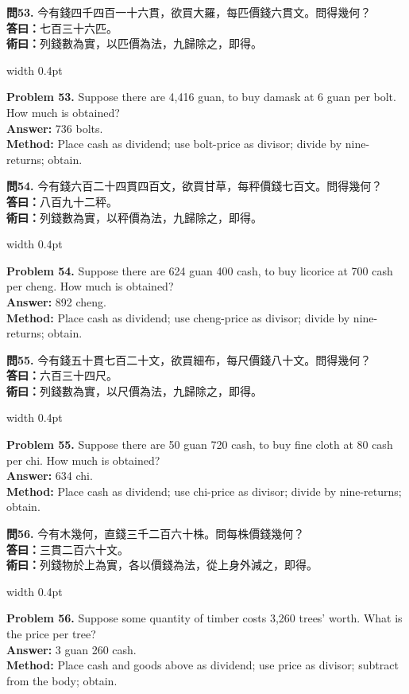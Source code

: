 \documentclass[10pt,a4paper]{article}
\newlength{\cnwidth}
\newlength{\enwidth}
\newcommand{\bilingual}[2]{%
  \noindent%
  \begin{minipage}[t]{\cnwidth}%
    #1%
  \end{minipage}%
  \hfill\vrule width 0.4pt\hfill%
  \begin{minipage}[t]{\enwidth}%
    #2%
  \end{minipage}%
  \par\smallskip%
}
\begin{document}
\bilingual{%
  \textbf{問53.}
  今有錢四千四百一十六貫，欲買大羅，每匹價錢六貫文。問得幾何？\\
  \textbf{答曰：}七百三十六匹。\\
  \textbf{術曰：}列錢數為實，以匹價為法，九歸除之，即得。
}{%
  \textbf{Problem 53.}
  Suppose there are 4,416 guan, to buy damask at 6 guan per bolt.
  How much is obtained?\\
  \textbf{Answer:} 736 bolts.\\
  \textbf{Method:} Place cash as dividend; use bolt-price as divisor; divide by
  nine-returns; obtain.
}

\bilingual{%
  \textbf{問54.}
  今有錢六百二十四貫四百文，欲買甘草，每秤價錢七百文。問得幾何？\\
  \textbf{答曰：}八百九十二秤。\\
  \textbf{術曰：}列錢數為實，以秤價為法，九歸除之，即得。
}{%
  \textbf{Problem 54.}
  Suppose there are 624 guan 400 cash, to buy licorice at 700 cash per cheng.
  How much is obtained?\\
  \textbf{Answer:} 892 cheng.\\
  \textbf{Method:} Place cash as dividend; use cheng-price as divisor; divide by
  nine-returns; obtain.
}

\bilingual{%
  \textbf{問55.}
  今有錢五十貫七百二十文，欲買細布，每尺價錢八十文。問得幾何？\\
  \textbf{答曰：}六百三十四尺。\\
  \textbf{術曰：}列錢數為實，以尺價為法，九歸除之，即得。
}{%
  \textbf{Problem 55.}
  Suppose there are 50 guan 720 cash, to buy fine cloth at 80 cash per chi.
  How much is obtained?\\
  \textbf{Answer:} 634 chi.\\
  \textbf{Method:} Place cash as dividend; use chi-price as divisor; divide by
  nine-returns; obtain.
}

\bilingual{%
  \textbf{問56.}
  今有木幾何，直錢三千二百六十株。問每株價錢幾何？\\
  \textbf{答曰：}三貫二百六十文。\\
  \textbf{術曰：}列錢物於上為實，各以價錢為法，從上身外減之，即得。
}{%
  \textbf{Problem 56.}
  Suppose some quantity of timber costs 3,260 trees' worth.
  What is the price per tree?\\
  \textbf{Answer:} 3 guan 260 cash.\\
  \textbf{Method:} Place cash and goods above as dividend; use price as divisor;
  subtract from the body; obtain.
}
\end{document}
